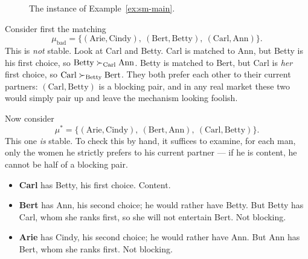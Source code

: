 \begin{figure}[ht]
\centering
{}
\caption{The instance of Example~\ref{ex:sm-main}.}
\label{fig:sm-instance}
\end{figure}

Consider first the matching
\[
  \mu_{\mathrm{bad}} =
  \{(\text{Arie},\text{Cindy}),\ (\text{Bert},\text{Betty}),\
    (\text{Carl},\text{Ann})\}.
\]
This is \emph{not} stable. Look at Carl and Betty. Carl is matched to Ann, but
Betty is his first choice, so $\text{Betty} \succ_{\text{Carl}} \text{Ann}$.
Betty is matched to Bert, but Carl is \emph{her} first choice, so
$\text{Carl} \succ_{\text{Betty}} \text{Bert}$. They both prefer each other to
their current partners: $(\text{Carl},\text{Betty})$ is a blocking pair, and
in any real market these two would simply pair up and leave the mechanism
looking foolish.

Now consider
\[
  \mu^{*} =
  \{(\text{Arie},\text{Cindy}),\ (\text{Bert},\text{Ann}),\
    (\text{Carl},\text{Betty})\}.
\]
This one \emph{is} stable. To check this by hand, it suffices to examine, for
each man, only the women he strictly prefers to his current partner --- if he
is content, he cannot be half of a blocking pair.

\begin{itemize}[nosep]
  \item \textbf{Carl} has Betty, his first choice. Content.
  \item \textbf{Bert} has Ann, his second choice; he would rather have Betty.
        But Betty has Carl, whom she ranks first, so she will not entertain
        Bert. Not blocking.
  \item \textbf{Arie} has Cindy, his second choice; he would rather have Ann.
        But Ann has Bert, whom she ranks first. Not blocking.
\end{itemize}

